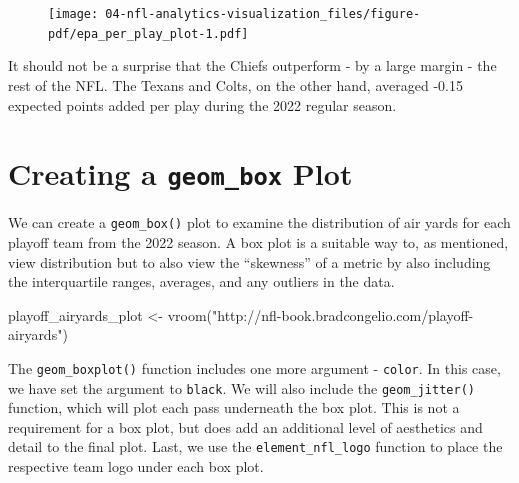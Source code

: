 \documentclass[
  letterpaper,
]{krantz}
\newenvironment{Shaded}{\begin{snugshade}}{\end{snugshade}}
\newcommand{\FunctionTok}[1]{\textcolor[rgb]{0.28,0.35,0.67}{#1}}
\newcommand{\NormalTok}[1]{\textcolor[rgb]{0.00,0.23,0.31}{#1}}
\newcommand{\OtherTok}[1]{\textcolor[rgb]{0.00,0.23,0.31}{#1}}
\newcommand{\StringTok}[1]{\textcolor[rgb]{0.13,0.47,0.30}{#1}}
\begin{document}
\begin{figure}[H]

{\centering \texttt{[image: 04-nfl-analytics-visualization\_files/figure-pdf/epa\_per\_play\_plot-1.pdf]}

}

\end{figure}

It should not be a surprise that the Chiefs outperform - by a large
margin - the rest of the NFL. The Texans and Colts, on the other hand,
averaged -0.15 expected points added per play during the 2022 regular
season.

\hypertarget{creating-a-geom_box-plot}{%
\section{\texorpdfstring{Creating a \texttt{geom\_box}
Plot}{Creating a geom\_box Plot}}\label{creating-a-geom_box-plot}}

We can create a \texttt{geom\_box()} plot to examine the distribution of
air yards for each playoff team from the 2022 season. A box plot is a
suitable way to, as mentioned, view distribution but to also view the
``skewness'' of a metric by also including the interquartile ranges,
averages, and any outliers in the data.

\begin{Shaded}
\begin{Highlighting}[]
\NormalTok{playoff\_airyards\_plot }\OtherTok{\textless{}{-}} \FunctionTok{vroom}\NormalTok{(}\StringTok{"http://nfl{-}book.bradcongelio.com/playoff{-}airyards"}\NormalTok{)}
\end{Highlighting}
\end{Shaded}

The \texttt{geom\_boxplot()} function includes one more argument -
\texttt{color}. In this case, we have set the argument to
\texttt{black}. We will also include the \texttt{geom\_jitter()}
function, which will plot each pass underneath the box plot. This is not
a requirement for a box plot, but does add an additional level of
aesthetics and detail to the final plot. Last, we use the
\texttt{element\_nfl\_logo} function to place the respective team logo
under each box plot.
\end{document}
